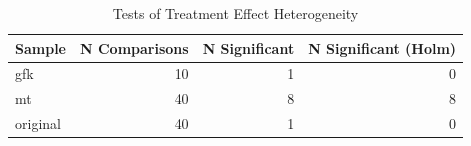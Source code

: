 \begin{table}[!h]
\centering
\caption{Tests of Treatment Effect Heterogeneity}
\centering
\begin{tabular}[t]{lrrr}
\toprule
Sample & N Comparisons & N Significant & N Significant (Holm)\\
\midrule
gfk & 10 & 1 & 0\\
mt & 40 & 8 & 8\\
original & 40 & 1 & 0\\
\bottomrule
\end{tabular}
\end{table}
